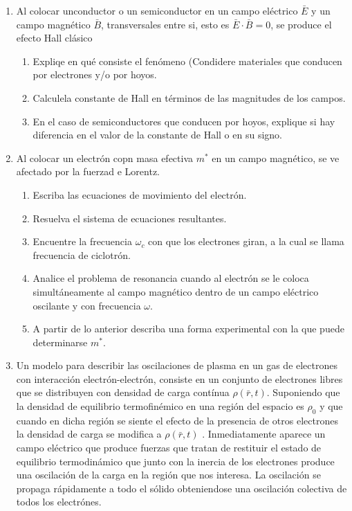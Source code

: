 \documentclass[]{article}
\begin{document}
\begin{enumerate}
\begin{enumerate}
\end{enumerate}
\item Al colocar unconductor o un semiconductor en un campo eléctrico $\bar{E}$ y un campo magnético $\bar{B}$, transversales entre si, esto es $\bar{E}\cdot\bar{B}=0$, se produce el efecto Hall clásico
\begin{enumerate}
\item Expliqe en qué consiste el fenómeno (Condidere materiales que conducen por electrones y/o por hoyos.
\item Calculela constante de Hall en términos de las magnitudes de los campos.
\item En el caso de semiconductores que conducen por hoyos, explique si hay diferencia en el valor de la constante de Hall o en su signo.
\end{enumerate}
\item Al colocar un electrón copn masa efectiva $m^*$ en un campo magnético, se ve afectado por la fuerzad e Lorentz.
  \begin{enumerate}
  \item Escriba las ecuaciones de movimiento del electrón.
  \item Resuelva el sistema de ecuaciones resultantes.
  \item Encuentre la frecuencia $\omega_c$ con que los electrones giran, a la cual se llama frecuencia de ciclotrón.
  \item Analice el problema de resonancia  cuando al electrón se le coloca simultáneamente al campo magnético dentro de un campo eléctrico oscilante y con frecuencia $\omega$.
  \item A partir de lo anterior describa una forma experimental con la que puede determinarse $m^*$.
  \end{enumerate}
\item Un modelo para describir las oscilaciones de plasma en un gas de electrones con interacción electrón-electrón, consiste en un conjunto de electrones libres que se  distribuyen con densidad de carga contínua $\rho(\bar{r},t)$. Suponiendo que la densidad de equilibrio termofinémico en una región del espacio es $\rho_0$ y que cuando en dicha región se siente el efecto de la presencia de otros electrones la densidad de carga se modifica a $\rho(\bar{r},t)$ . Inmediatamente aparece  un campo eléctrico que produce fuerzas que tratan de restituir el estado de equilibrio termodinámico que junto con la inercia de los electrones  produce una oscilación de la carga en la región que nos interesa. La oscilación se propaga rápidamente a todo el sólido obteniendose una oscilación colectiva de todos los electrónes.

\end{enumerate}
\end{document}
